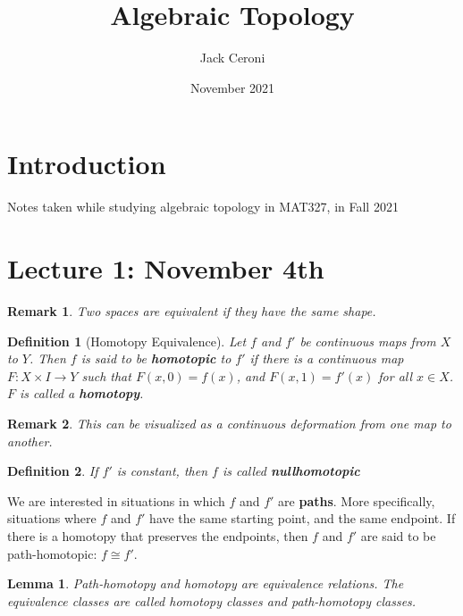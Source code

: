 \documentclass[10pt, oneside]{amsart}
\title{Algebraic Topology}
\author{Jack Ceroni}
\date{November 2021}
\newtheorem{defn}{Definition}
\newtheorem{rem}{Remark}
\newtheorem{lem}{Lemma}
\begin{document}
    \maketitle

    \tableofcontents

    \vspace{.25in}

    \section{Introduction}

    Notes taken while studying algebraic topology in MAT327, in Fall 2021

    \newpage

    \section{Lecture 1: November 4th}

    \begin{rem}
      Two spaces are equivalent if they have the same shape.
    \end{rem}

    \begin{defn}[Homotopy Equivalence]
      Let $f$ and $f'$ be continuous maps from $X$ to $Y$. Then $f$ is said to be \textbf{homotopic} to $f'$ if there is a
      continuous map $F : X \times I \rightarrow Y$ such that $F(x, 0) = f(x)$, and
      $F(x, 1) = f'(x)$ for all $x \in X$. $F$ is called a \textbf{homotopy}.
    \end{defn}

    \begin{rem}
      This can be visualized as a continuous deformation from one map to another.
    \end{rem}

    \begin{defn}
      If $f'$ is constant, then $f$ is called \textbf{nullhomotopic}
    \end{defn}

    We are interested in situations in which $f$ and $f'$ are \textbf{paths}. More specifically, situations where $f$ and $f'$
    have the same starting point, and the same endpoint.
    If there is a homotopy that preserves the endpoints, then $f$ and $f'$ are said to be path-homotopic: $f \cong f'$.
    \newline

    \begin{lem}
      Path-homotopy and homotopy are equivalence relations. The equivalence classes are called homotopy classes and path-homotopy classes.
    \end{lem}
\end{document}
